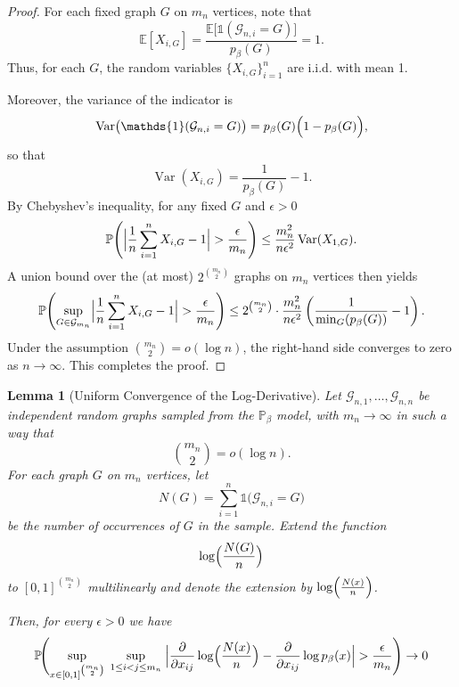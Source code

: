 \documentclass[12pt]{article}
\numberwithin{equation}{section}
\newtheorem{lemma}{Lemma}[section]
\begin{document}
\begin{proof}
For each fixed graph \(G\) on \(m_n\) vertices, note that
\[
\mathbb{E}[X_{i,G}] = \frac{\mathbb{E}\bigl[\mathds{1}(\mathcal{G}_{n,i}=G)\bigr]}{p_{\beta}(G)} = 1.
\]
Thus, for each \(G\), the random variables \(\{X_{i,G}\}_{i=1}^n\) are i.i.d. with mean 1.

Moreover, the variance of the indicator is
\[
\operatorname{Var}\bigl(\mathds{1}(\mathcal{G}_{n,i}=G)\bigr) = p_{\beta}(G)\Bigl(1-p_{\beta}(G)\Bigr),
\]
so that
\[
\operatorname{Var}(X_{i,G}) = \frac{1}{p_{\beta}(G)} - 1.
\]
By Chebyshev's inequality, for any fixed \(G\) and \(\epsilon>0\)
\[
\mathbb{P}\Biggl(\Bigl|\frac{1}{n}\sum_{i=1}^{n} X_{i,G} - 1\Bigr| > \frac{\epsilon}{m_n}\Biggr)
\le \frac{m_n^2}{n\epsilon^2}\operatorname{Var}(X_{1,G}).
\]
A union bound over the (at most) \(2^{\binom{m_n}{2}}\) graphs on \(m_n\) vertices then yields
\[
\mathbb{P}\Biggl(\sup_{G\in \mathcal{G}_{m_n}} \Bigl|\frac{1}{n}\sum_{i=1}^{n} X_{i,G} - 1\Bigr| > \frac{\epsilon}{m_n}\Biggr)
\le 2^{\binom{m_n}{2}} \cdot \frac{m_n^2}{n\epsilon^2}\left(\frac{1}{\min_{G}(p_{\beta}(G))}-1\right).
\]
Under the assumption \({m_n\choose 2}=o(\log n)\), the right-hand side converges to zero as \(n\to\infty\). This completes the proof.
\end{proof}

\begin{lemma}[Uniform Convergence of the Log-Derivative]{\label{weak_law_der}}
Let \(\mathcal{G}_{n,1},\dots, \mathcal{G}_{n,n}\) be independent random graphs sampled from the \(\mathbb{P}_{\beta}\) model, with \(m_n\to\infty\) in such a way that
\[
\binom{m_n}{2} = o(\log n).
\]
For each graph \(G\) on \(m_n\) vertices, let 
\[
N(G)=\sum_{i=1}^{n} \mathds{1}\bigl(\mathcal{G}_{n,i}=G\bigr)
\]
be the number of occurrences of \(G\) in the sample. Extend the function 
\[
\log\Bigl(\frac{N(G)}{n}\Bigr)
\]
to \([0,1]^{\binom{m_n}{2}}\) multilinearly and denote the extension by \(\log\Bigl(\frac{N(x)}{n}\Bigr)\).

Then, for every \(\epsilon>0\) we have
\[
\mathbb{P}\!\Biggl(\sup_{x\in[0,1]^{\binom{m_n}{2}}}\; \sup_{1\le i<j\le m_n}\; \Bigl|\frac{\partial}{\partial x_{ij}}\log\Bigl(\frac{N(x)}{n}\Bigr)-\frac{\partial}{\partial x_{ij}}\log p_{\beta}(x)\Bigr| > \frac{\epsilon}{m_n}\Biggr)
\rightarrow 0
\]

\end{lemma}
\end{document}
